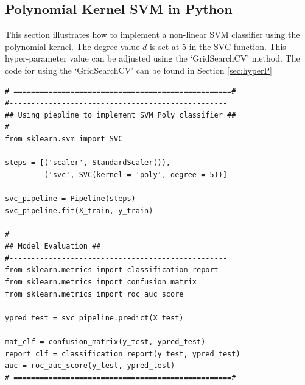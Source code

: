 \newpage
\subsection{Polynomial Kernel SVM in Python}

This section illustrates how to implement a non-linear SVM classifier using the polynomial kernel. The degree value $d$ is set at 5 in the SVC function. This hyper-parameter value can be adjusted using the ‘GridSearchCV’ method. The code for using the ‘GridSearchCV’ can be found in Section \ref{sec:hyperP}

\begin{lstlisting}
# ==================================================#
#--------------------------------------------------
## Using piepline to implement SVM Poly classifier ##
#--------------------------------------------------
from sklearn.svm import SVC

steps = [('scaler', StandardScaler()),
         ('svc', SVC(kernel = 'poly', degree = 5))]

svc_pipeline = Pipeline(steps)
svc_pipeline.fit(X_train, y_train)

#--------------------------------------------------
## Model Evaluation ##
#--------------------------------------------------
from sklearn.metrics import classification_report
from sklearn.metrics import confusion_matrix
from sklearn.metrics import roc_auc_score

ypred_test = svc_pipeline.predict(X_test)

mat_clf = confusion_matrix(y_test, ypred_test)
report_clf = classification_report(y_test, ypred_test)
auc = roc_auc_score(y_test, ypred_test)
# ==================================================#
\end{lstlisting}

\newpage
